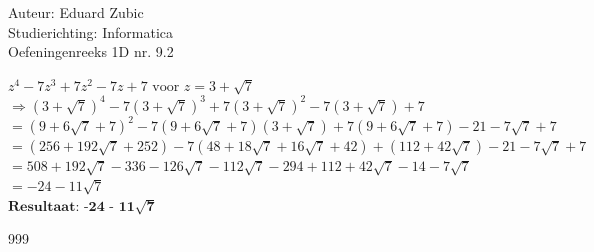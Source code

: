 \documentclass[a4paper]{article}
\begin{document}
  
\noindent \large Auteur: Eduard Zubic \\
\noindent \large Studierichting: Informatica\\
\noindent \large Oefeningenreeks 1D nr. 9.2\\

\medskip

\normalsize

$ z^4 - 7z^3 + 7z^2 - 7z + 7 \text{ voor } z = 3 + \sqrt{7} $\\

$ \Rightarrow (3 + \sqrt{7})^4 - 7(3 + \sqrt{7})^3 + 7(3 + \sqrt{7})^2 - 7(3 + \sqrt{7}) + 7 $\\

$ = (9 + 6\sqrt{7} + 7)^2 - 7(9 + 6\sqrt{7} + 7)(3 + \sqrt{7}) + 7(9 + 6\sqrt{7} + 7) - 21 -7\sqrt{7} + 7 $\\

$ = (256 + 192\sqrt{7} + 252) - 7(48 +18\sqrt{7} + 16\sqrt{7} + 42) + (112 + 42\sqrt{7}) - 21 - 7\sqrt{7} + 7$\\

$ = 508 + 192\sqrt{7} - 336 - 126\sqrt{7} - 112\sqrt{7} - 294 + 112 + 42\sqrt{7} - 14 - 7\sqrt{7} $\\

$ = -24 -11\sqrt{7} $\\ 

$\textbf{Resultaat: -24 - 11}\boldsymbol{\sqrt{7}}$


\begin{thebibliography}{999} 
\end{thebibliography}
\end{document}
